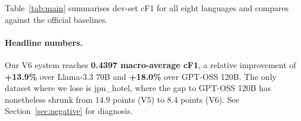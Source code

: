\documentclass[runningheads]{llncs}
\begin{document}
Table~\ref{tab:main} summarises dev-set cF1 for all eight languages
and compares against the official baselines.

\begin{table}[t]
\centering\small
\caption{Dev-set cF1 across the eight SemEval-2026 Task~3 datasets.
Bold marks the best system per row. Our V6 system wins on
7/8 datasets and beats the strongest LLM baseline by $+5.4$ absolute
points on the macro-average.}
\label{tab:main}
\setlength{\tabcolsep}{4pt}
\end{table}

\paragraph{Headline numbers.}
Our V6 system reaches \textbf{0.4397 macro-average cF1}, a relative
improvement of \textbf{+13.9\%} over Llama-3.3 70B and \textbf{+18.0\%}
over GPT-OSS 120B. The only dataset where we lose is jpn\_hotel,
where the gap to GPT-OSS 120B has nonetheless shrunk from 14.9 points
(V5) to 8.4 points (V6). See Section~\ref{sec:negative} for diagnosis.

\end{document}
